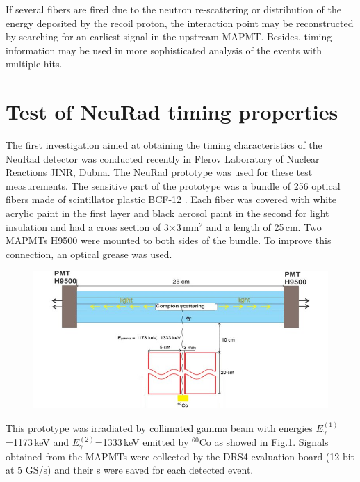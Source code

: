 \documentclass{webofc}
\begin{document}
If several  fibers are fired due to the neutron re-scattering or distribution of the energy deposited by the recoil proton, the interaction point may be reconstructed by searching for an earliest signal in the upstream MAPMT. Besides, timing information may be used in more sophisticated analysis of the events with multiple hits.

\section{Test of NeuRad timing properties}

The first investigation aimed at obtaining the timing characteristics of the NeuRad detector was conducted recently in Flerov Laboratory of Nuclear Reactions JINR, Dubna. The NeuRad prototype was used for these test measurements. The sensitive part of the prototype was a bundle of 256 optical fibers made of scintillator plastic BCF-12 \cite{crystals}. 
Each fiber was covered with white acrylic paint in the first layer and black aerosol paint in the second for light insulation and had a cross section of 3$\times$3\,mm$^2$ and a length of 25\,cm. Two MAPMTs H9500 \cite{hm} were mounted to both sides of the bundle. To improve this connection, an optical grease was used.

\begin{figure}[h]
	\centering
	\includegraphics[width=0.7\linewidth]{NeuRadexperiment.png}
	\label{ris:neuradexp}
\end{figure}

This prototype was irradiated by collimated gamma beam with energies $E^{(1)}_{\gamma}$=1173\,keV and $E^{(2)}_{\gamma}$=1333\,keV emitted by $^{60}$Co as showed in Fig.\ref{ris:neuradexp}. Signals obtained from the MAPMTs were collected by the DRS4 evaluation board (12 bit at 5 GS/s) and their s were saved for each detected event.
\end{document}
